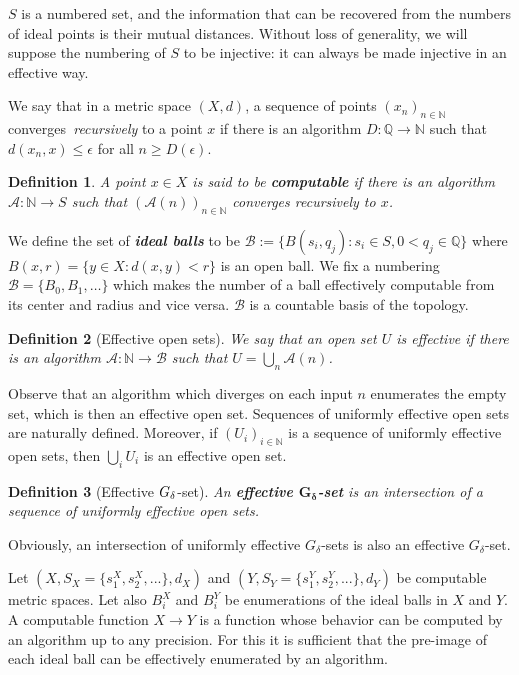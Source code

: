 \documentclass[copyright,creativecommons]{eptcs}
\newtheorem{definition}{Definition}
\numberwithin{equation}{section}
\begin{document}
$S$ is a numbered set, and the information that can be recovered from the
numbers of ideal points is their mutual distances. Without loss of
generality, we will suppose the numbering of $S$ to be injective: it can
always be made injective in an effective way.

We say that in a metric space $(X,d)$, a sequence of points $(x_{n})_{n\in
\mathbb{N}}$ converges\emph{\ recursively }to a point $x$ if there is an
algorithm $D:\mathbb{Q\rightarrow N}$ such that $d(x_{n},x)\leq \epsilon $
for all $n\geq D(\epsilon )$.

\begin{definition}
\label{comp_points}A point $x\in X$ is said to be \textbf{\emph{computable}}
if there is an algorithm $\mathcal{A}:\mathbb{N}\rightarrow S$ such that $(\mathcal{A}(n))_{n\in \mathbb{N}}$ converges recursively to $x$.
\end{definition}

We define the set of \textbf{\emph{ideal balls}} to be $\mathcal{B}:=\{B(s_{i},q_{j}):s_{i}\in S,0<q_{j}\in \mathbb{Q}\}$ where $B(x,r)=\{y\in
X:d(x,y)<r\}$ is an open ball. We fix a numbering $\mathcal{B}=\{B_{0},B_{1},\ldots \}$ which makes the number of a ball effectively
computable from its center and radius and vice versa. $\mathcal{B}$ is a
countable basis of the topology.

\begin{definition}[Effective open sets]
\label{reop} We say that an open set $U$ is \emph{effective} if there is an
algorithm $\mathcal{A}:\mathbb{N}\rightarrow \mathcal{B}$ such that $U=\bigcup_{n}\mathcal{A}(n)$.
\end{definition}

Observe that an algorithm which diverges on each input $n$ enumerates the
empty set, which is then an effective open set. Sequences of uniformly
effective open sets are naturally defined. Moreover, if $(U_{i})_{i\in
\mathbb{N}}$ is a sequence of uniformly effective open sets, then $\bigcup_{i}U_{i}$ is an effective open set.

\begin{definition}[Effective $G_{\protect\delta }$-set]
An \textbf{\emph{effective $\boldsymbol{G_{\delta }}$-set}} is an
intersection of a sequence of uniformly effective open sets.
\end{definition}

Obviously, an intersection of uniformly effective $G_{\delta }$-sets is also
an effective $G_{\delta }$-set.

Let $(X,S_{X}=\{s_{1}^{X},s_{2}^{X},...\},d_{X})$ and $(Y,S_{Y}=\{s_{1}^{Y},s_{2}^{Y},...\},d_{Y})$ be computable metric spaces. Let also $B_{i}^{X}$ and $B_{i}^{Y}$ be enumerations of the ideal balls in $X$ and $Y$. A computable function $X\rightarrow Y$ is a function whose behavior can be
computed by an algorithm up to any precision. For this it is sufficient that
the pre-image of each ideal ball can be effectively enumerated by an
algorithm.
\end{document}
